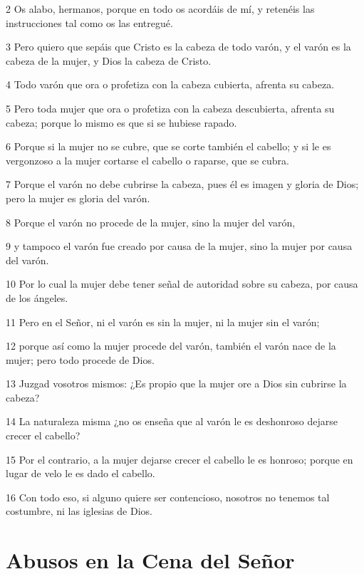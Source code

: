 \par 2 Os alabo, hermanos, porque en todo os acordáis de mí, y retenéis las instrucciones tal como os las entregué.
\par 3 Pero quiero que sepáis que Cristo es la cabeza de todo varón, y el varón es la cabeza de la mujer, y Dios la cabeza de Cristo.
\par 4 Todo varón que ora o profetiza con la cabeza cubierta, afrenta su cabeza.
\par 5 Pero toda mujer que ora o profetiza con la cabeza descubierta, afrenta su cabeza; porque lo mismo es que si se hubiese rapado.
\par 6 Porque si la mujer no se cubre, que se corte también el cabello; y si le es vergonzoso a la mujer cortarse el cabello o raparse, que se cubra.
\par 7 Porque el varón no debe cubrirse la cabeza, pues él es imagen y gloria de Dios; pero la mujer es gloria del varón.
\par 8 Porque el varón no procede de la mujer, sino la mujer del varón,
\par 9 y tampoco el varón fue creado por causa de la mujer, sino la mujer por causa del varón.
\par 10 Por lo cual la mujer debe tener señal de autoridad sobre su cabeza, por causa de los ángeles.
\par 11 Pero en el Señor, ni el varón es sin la mujer, ni la mujer sin el varón;
\par 12 porque así como la mujer procede del varón, también el varón nace de la mujer; pero todo procede de Dios.
\par 13 Juzgad vosotros mismos: ¿Es propio que la mujer ore a Dios sin cubrirse la cabeza?
\par 14 La naturaleza misma ¿no os enseña que al varón le es deshonroso dejarse crecer el cabello?
\par 15 Por el contrario, a la mujer dejarse crecer el cabello le es honroso; porque en lugar de velo le es dado el cabello.
\par 16 Con todo eso, si alguno quiere ser contencioso, nosotros no tenemos tal costumbre, ni las iglesias de Dios.

\section*{Abusos en la Cena del Señor}

